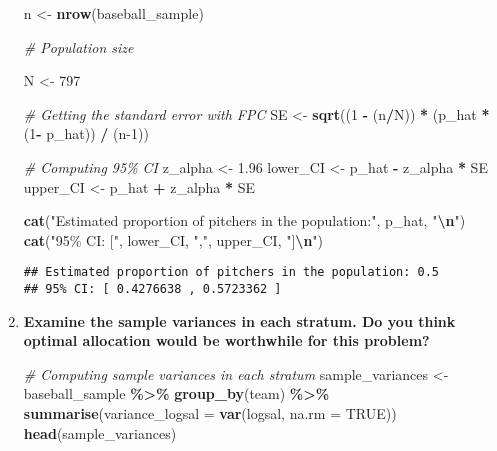\documentclass[]{article}
\makeatletter
\newenvironment{Shaded}{\begin{snugshade}}{\end{snugshade}}
\newcommand{\AttributeTok}[1]{\textcolor[rgb]{0.13,0.29,0.53}{#1}}
\newcommand{\CommentTok}[1]{\textcolor[rgb]{0.56,0.35,0.01}{\textit{#1}}}
\newcommand{\ConstantTok}[1]{\textcolor[rgb]{0.56,0.35,0.01}{#1}}
\newcommand{\DecValTok}[1]{\textcolor[rgb]{0.00,0.00,0.81}{#1}}
\newcommand{\FloatTok}[1]{\textcolor[rgb]{0.00,0.00,0.81}{#1}}
\newcommand{\FunctionTok}[1]{\textcolor[rgb]{0.13,0.29,0.53}{\textbf{#1}}}
\newcommand{\NormalTok}[1]{#1}
\newcommand{\OtherTok}[1]{\textcolor[rgb]{0.56,0.35,0.01}{#1}}
\newcommand{\SpecialCharTok}[1]{\textcolor[rgb]{0.81,0.36,0.00}{\textbf{#1}}}
\newcommand{\StringTok}[1]{\textcolor[rgb]{0.31,0.60,0.02}{#1}}
\newcommand{\skipitems}[1]{%
  \addtocounter{\@enumctr}{#1}%
}
\makeatother
\begin{document}
\begin{enumerate}[label=(\alph*)]
\begin{Shaded}
\begin{Highlighting}[]
\NormalTok{n }\OtherTok{\textless{}{-}} \FunctionTok{nrow}\NormalTok{(baseball\_sample)}

\CommentTok{\# Population size }

\NormalTok{N }\OtherTok{\textless{}{-}} \DecValTok{797} 

\CommentTok{\# Getting the standard error with FPC }
\NormalTok{SE }\OtherTok{\textless{}{-}} \FunctionTok{sqrt}\NormalTok{((}\DecValTok{1} \SpecialCharTok{{-}}\NormalTok{ (n}\SpecialCharTok{/}\NormalTok{N)) }\SpecialCharTok{*}\NormalTok{ (p\_hat }\SpecialCharTok{*}\NormalTok{ (}\DecValTok{1}\SpecialCharTok{{-}}\NormalTok{ p\_hat)) }\SpecialCharTok{/}\NormalTok{ (n}\DecValTok{{-}1}\NormalTok{))}

\CommentTok{\# Computing 95\% CI}
\NormalTok{z\_alpha }\OtherTok{\textless{}{-}} \FloatTok{1.96}
\NormalTok{lower\_CI }\OtherTok{\textless{}{-}}\NormalTok{ p\_hat }\SpecialCharTok{{-}}\NormalTok{ z\_alpha }\SpecialCharTok{*}\NormalTok{ SE}
\NormalTok{upper\_CI }\OtherTok{\textless{}{-}}\NormalTok{ p\_hat }\SpecialCharTok{+}\NormalTok{ z\_alpha }\SpecialCharTok{*}\NormalTok{ SE}

\FunctionTok{cat}\NormalTok{(}\StringTok{"Estimated proportion of pitchers in the population:"}\NormalTok{, p\_hat, }\StringTok{"}\SpecialCharTok{\textbackslash{}n}\StringTok{"}\NormalTok{)}
\FunctionTok{cat}\NormalTok{(}\StringTok{"95\% CI: ["}\NormalTok{, lower\_CI, }\StringTok{","}\NormalTok{, upper\_CI, }\StringTok{"]}\SpecialCharTok{\textbackslash{}n}\StringTok{"}\NormalTok{)}
\end{Highlighting}
\end{Shaded}

\begin{verbatim}
## Estimated proportion of pitchers in the population: 0.5
## 95% CI: [ 0.4276638 , 0.5723362 ]
\end{verbatim}

\skipitems{1}

\item \textbf{Examine the sample variances in each stratum. Do you think optimal allocation would be worthwhile for this problem?} 

\begin{Shaded}
\begin{Highlighting}[]
\CommentTok{\# Computing sample variances in each stratum}
\NormalTok{sample\_variances }\OtherTok{\textless{}{-}}\NormalTok{ baseball\_sample }\SpecialCharTok{\%\textgreater{}\%}
  \FunctionTok{group\_by}\NormalTok{(team) }\SpecialCharTok{\%\textgreater{}\%}
  \FunctionTok{summarise}\NormalTok{(}\AttributeTok{variance\_logsal =} \FunctionTok{var}\NormalTok{(logsal, }\AttributeTok{na.rm =} \ConstantTok{TRUE}\NormalTok{))}
\FunctionTok{head}\NormalTok{(sample\_variances)}
\end{Highlighting}
\end{Shaded}


\end{enumerate}
\end{document}
